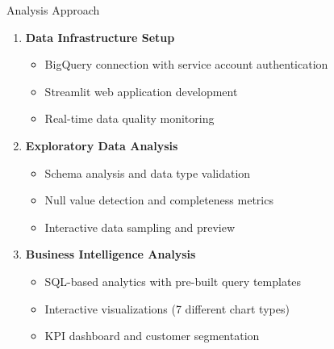 \documentclass[aspectratio=169]{beamer}
\begin{document}
\begin{frame}{Analysis Approach}
\begin{enumerate}
    \item \textbf{Data Infrastructure Setup}
    \begin{itemize}
        \item BigQuery connection with service account authentication
        \item Streamlit web application development
        \item Real-time data quality monitoring
    \end{itemize}
    
    \item \textbf{Exploratory Data Analysis}
    \begin{itemize}
        \item Schema analysis and data type validation
        \item Null value detection and completeness metrics
        \item Interactive data sampling and preview
    \end{itemize}
    
    \item \textbf{Business Intelligence Analysis}
    \begin{itemize}
        \item SQL-based analytics with pre-built query templates
        \item Interactive visualizations (7 different chart types)
        \item KPI dashboard and customer segmentation
    \end{itemize}
\end{enumerate}
\end{frame}
\end{document}
